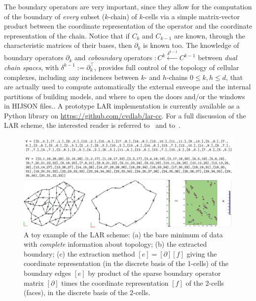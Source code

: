 The boundary operators are very important, since they allow for the computation of the boundary of \emph{every} subset ($k$-chain) of $k$-cells via a simple matrix-vector product between the coordinate representation of the operator and the coordinate representation of the chain. Notice that if $C_k$ and $C_{k-1}$ are known, through the characteristic matrices of their bases, then $\partial_k$ is known too.
The knowledge of boundary operators $\partial_k$ and \emph{coboundary} operators $: C^{k} \xleftarrow{\delta^{k-1}} C^{k-1}$ between \emph{dual chain spaces}, with $\delta^{k-1} := \partial_k^\top$, provides full control of the topology of cellular complexes, including  any incidences between $k$- and $h$-chains $0\leq k,h\leq d$, that are actually used to compute automatically the external enveope and the internal partitions of building models, and where to open the doors and/or the windows in HIJSON files..
A prototype LAR implementation is currently available as a Python library on \href{https://github.com/cvdlab/lar-cc}{https://github.com/cvdlab/lar-cc}. For a full discussion of the LAR scheme, the interested reader is referred to~\cite{Dicarlo:2014:TNL:2543138.2543294} and to~\cite{cadanda:2015}.


\begin{figure}[ptb] %
 \centering
 \includegraphics[width=\linewidth]{images/minimum} 
 \caption{A toy example of the LAR scheme: (a) the bare minimum of data with \emph{complete} information about topology; (b) the extracted boundary; (c) the extraction method $[e] = [\partial][f]$ giving the coordinate representation (in the discrete basis of the 1-cells) of the boundary edges $[e]$ by product of the sparse boundary operator matrix $[\partial]$ times the coordinate representation $[f]$ of the 2-cells (faces), in the discrete basis of the 2-cells.}
 \label{fig:minimum}
\end{figure}

